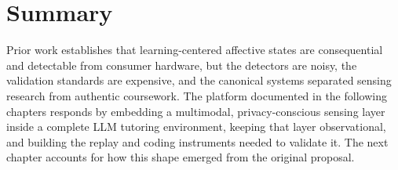 \section{Summary}

Prior work establishes that learning-centered affective states are
consequential and detectable from consumer hardware, but the detectors
are noisy, the validation standards are expensive, and the canonical
systems separated sensing research from authentic coursework. The
platform documented in the following chapters responds by embedding a
multimodal, privacy-conscious sensing layer inside a complete LLM
tutoring environment, keeping that layer observational, and building the
replay and coding instruments needed to validate it. The next chapter
accounts for how this shape emerged from the original proposal.
